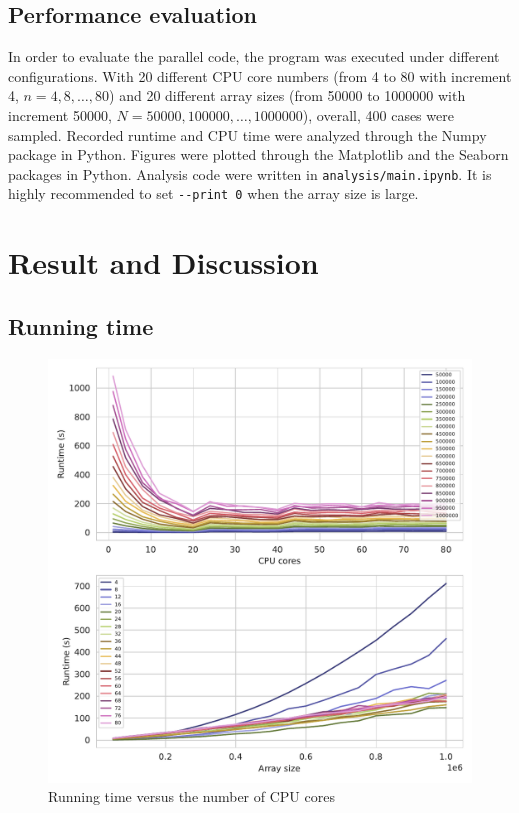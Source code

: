 \documentclass[twoside,12pt]{article}
\theoremstyle{definition}
\theoremstyle{remark}
\begin{document}
\subsection{Performance evaluation}
In order to evaluate the parallel code, the program was executed under 
different configurations.
With 20 different CPU core numbers (from 4 to 80 with increment 4, $n=4, 8,\dots, 80$)
and 20 different array sizes (from 50000 to 1000000 with increment 50000, $N=50000, 100000, \dots, 1000000$), 
overall, 400 cases were sampled.
Recorded runtime and CPU time were analyzed through the Numpy package in Python.
Figures were plotted through the Matplotlib and the Seaborn packages in Python.
Analysis code were written in \lstinline|analysis/main.ipynb|.
It is highly recommended to set \lstinline|--print 0| when the array size is large.


\newpage
\section{Result and Discussion}
\subsection{Running time}
\begin{figure}[H]
    \centering
    \includegraphics[width=\textwidth]{../analysis/runtime.pdf}
    \caption{Running time versus the number of CPU cores}
    \label{fig:runtime}
\end{figure}
\end{document}
